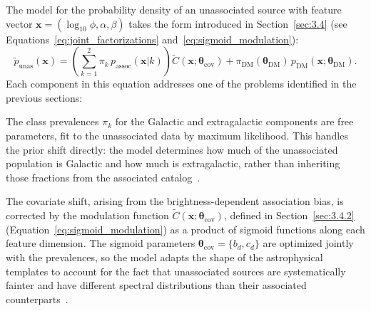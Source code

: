 The model for the probability density of an unassociated source with feature vector $\mathbf{x} = (\log_{10}\phi, \alpha, \beta)$ takes the form introduced in Section~\ref{sec:3.4} (see Equations~\ref{eq:joint_factorizations} and~\ref{eq:sigmoid_modulation}):
\begin{equation}
	\tilde{p}_\mathrm{unas}(\mathbf{x}) = \left(\sum_{k=1}^{2} \pi_k\, p_\mathrm{assoc}(\mathbf{x}|k)\right) \tilde{C}(\mathbf{x};\boldsymbol{\theta}_\mathrm{cov}) + \pi_\mathrm{DM}(\boldsymbol{\theta}_\mathrm{DM})\, p_\mathrm{DM}(\mathbf{x};\boldsymbol{\theta}_\mathrm{DM}).
	\label{eq:mixture_model_ch5}
\end{equation}
Each component in this equation addresses one of the problems identified in the previous sections:

The class prevalences $\pi_k$ for the Galactic and extragalactic components are free parameters, fit to the unassociated data by maximum likelihood.
This handles the prior shift directly: the model determines how much of the unassociated population is Galactic and how much is extragalactic, rather than inheriting those fractions from the associated catalog~\cite{10.1145/3117807_Gonzalez_quantification, Saerens_2002}.

The covariate shift, arising from the brightness-dependent association bias, is corrected by the modulation function $\tilde{C}(\mathbf{x};\boldsymbol{\theta}_\mathrm{cov})$, defined in Section~\ref{sec:3.4.2} (Equation~\ref{eq:sigmoid_modulation}) as a product of sigmoid functions along each feature dimension.
The sigmoid parameters $\boldsymbol{\theta}_\mathrm{cov} = \{b_d, c_d\}$ are optimized jointly with the prevalences, so the model adapts the shape of the astrophysical templates to account for the fact that unassociated sources are systematically fainter and have different spectral distributions than their associated counterparts~\cite{Amerio:2025fhz}.

